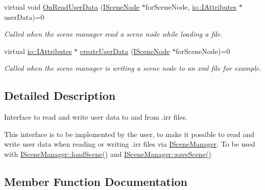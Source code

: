 \begin{DoxyCompactItemize}
virtual void \hyperlink{classirr_1_1scene_1_1ISceneUserDataSerializer_a48276bde0e05343d39ec25c6933f122d}{On\+Read\+User\+Data} (\hyperlink{classirr_1_1scene_1_1ISceneNode}{I\+Scene\+Node} $\ast$for\+Scene\+Node, \hyperlink{classirr_1_1io_1_1IAttributes}{io\+::\+I\+Attributes} $\ast$user\+Data)=0
\begin{DoxyCompactList}\small\item\em Called when the scene manager read a scene node while loading a file. \end{DoxyCompactList}\item 
virtual \hyperlink{classirr_1_1io_1_1IAttributes}{io\+::\+I\+Attributes} $\ast$ \hyperlink{classirr_1_1scene_1_1ISceneUserDataSerializer_a8d276882257602ffc03a23a38290ea44}{create\+User\+Data} (\hyperlink{classirr_1_1scene_1_1ISceneNode}{I\+Scene\+Node} $\ast$for\+Scene\+Node)=0
\begin{DoxyCompactList}\small\item\em Called when the scene manager is writing a scene node to an xml file for example. \end{DoxyCompactList}\end{DoxyCompactItemize}


\subsection{Detailed Description}
Interface to read and write user data to and from .irr files. 

This interface is to be implemented by the user, to make it possible to read and write user data when reading or writing .irr files via \hyperlink{classirr_1_1scene_1_1ISceneManager}{I\+Scene\+Manager}. To be used with \hyperlink{classirr_1_1scene_1_1ISceneManager_aa7641dd33e84fca7946ed17047349a3e}{I\+Scene\+Manager\+::load\+Scene()} and \hyperlink{classirr_1_1scene_1_1ISceneManager_a6dd059e96ff4f7233b7ba1ed7e39c337}{I\+Scene\+Manager\+::save\+Scene()} 

\subsection{Member Function Documentation}
\mbox{\label{classirr_1_1scene_1_1ISceneUserDataSerializer_a8d276882257602ffc03a23a38290ea44}} 

